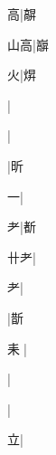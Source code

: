 \begin{multicols}{2}
{{\cjk{}{\cnsym{}　}{\cnsym{}　}高}|{\cjk{}髜}\par
{\cjk{}{\cnsym{}　}山高}|{\cjk{}巐}\par
{\cjk{}{\cnsym{}　}{\cnsym{}　}火}|{\cjk{}焺}\par
{}|{}\par
{}|{}\par
{\cjk{}{\cnsym{}　}{\cnsym{}　}{\cnsym{}　}}|{\cjk{}昕}\par
{\cjk{}{\cnsym{}　}{\cnsym{}　}一}|{}\par
{\cjk{}{\cnsym{}　}{\cnsym{}　}耂}|{\cjk{}斱}\par
{\cjk{}{\cnsym{}　}卄耂}|{}\par
{耂}|{}\par
{}|{\cjk{}斮}\par
{\cjk{}{\cnsym{}　}耒{\cnxJzr{}}}|{}\par
{}|{}\par
{}|{}\par
{\cjk{}{\cnsym{}　}{\cnsym{}　}立}|{}\par
}
\end{multicols}
